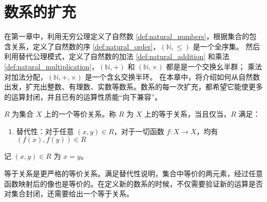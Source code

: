 \chapter{数系的扩充}

在第一章中，利用无穷公理定义了自然数 \ref{def:natural_numbers}，根据集合的包含关系，定义了自然数的序 \ref{def:natural_order}，$(\mathbb{N},\le)$ 是一个全序集。
然后利用替代公理模式，定义了自然数的加法 \ref{def:natural_addition} 和乘法 \ref{def:natural_multiplication}，$(\mathbb{N},+)$ 和 $(\mathbb{N},\times)$ 都是是一个交换幺半群；
乘法对加法分配，$(\mathbb{N},+,\times)$ 是一个含幺交换半环。
在本章中，将介绍如何从自然数出发，扩充出整数、有理数、实数等数系。数系的每一次扩充，都希望它能使更多的运算封闭，并且已有的运算性质能“向下兼容”。

\begin{definition}
    $ R $ 为集合 $ X $ 上的一个等价关系。称 $ R $ 为 $ X $ 上的等于关系，当且仅当，$ R $ 满足：
    \begin{enumerate}
        \item 替代性：对于任意 $(x,y)\in R$，对于一切函数 $f:X\to X$，均有 $(f(x),f(y))\in R$
    \end{enumerate}
    记 $(x,y)\in R$ 为 $ x=y $。
\end{definition}

\begin{note}
    等于关系是更严格的等价关系。满足替代性说明，集合中等价的两元素，经过任意函数映射后的像也是等价的。在定义新的数系的时候，不仅需要验证新的运算是否对集合封闭，还需要给出一个等于关系。
\end{note}

\vspace{1em}